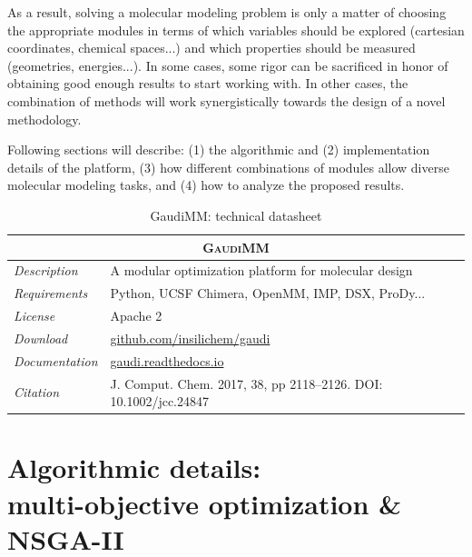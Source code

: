 As a result, solving a molecular modeling problem is only a matter of choosing the appropriate modules in terms of which variables should be explored (cartesian coordinates, chemical spaces...) and which properties should be measured (geometries, energies...). In some cases, some rigor can be sacrificed in honor of obtaining good enough results to start working with. In other cases, the combination of methods will work synergistically towards the design of a novel methodology.

Following sections will describe: (1) the algorithmic and (2) implementation details of the platform, (3) how different combinations of modules allow diverse molecular modeling tasks, and (4) how to analyze the proposed results.



\begin{table}[hbtp]
	\caption{GaudiMM: technical datasheet}
	\footnotesize
	\newcommand{\tableheading}[1]{\multicolumn{2}{c}{\textsc{#1}}}
	\begin{tabularx}{\textwidth}{RL}
		\toprule
		\tableheading{GaudiMM} \\
		\toprule
		\textit{Description} & A modular optimization platform for molecular design \\
		\midrule
		\textit{Requirements} & Python, UCSF Chimera, OpenMM, IMP, DSX, ProDy... \\
		\midrule
		\textit{License} & Apache 2 \\
		\midrule
		\textit{Download} & \href{https://github.com/insilichem/gaudi}{github.com/insilichem/gaudi} \\
		\midrule
		\textit{Documentation} & \href{https://gaudi.readthedocs.io}{gaudi.readthedocs.io} \\
		\midrule
		\textit{Citation} & J. Comput. Chem. 2017, 38, pp 2118–2126. DOI: 10.1002/jcc.24847 \\
		\bottomrule

	\end{tabularx}
\end{table}



\section[Algorithmic details]{Algorithmic details: \\ multi-objective optimization \& NSGA-II}

